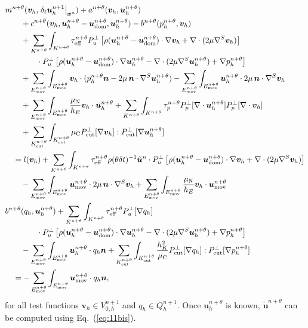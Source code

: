 \documentclass[11pt,a4paper,oneside,reqno]{amsart}
\newcommand{\Eq}[1]{(\ref{eq:#1})}
\newcommand{\sbm}[1]  {\mbox{{\boldmath{$\scriptstyle{#1}$}}}}
\def\u{{\bm u}}
\def\cl{\nonumber\\}
\def\el{{\nonumber}}
\def\nor{{\bm n}}
\def\vt{\bm v}
\begin{document}
\begin{align}
& m^{n+\theta}( \vt_h , \left. \delta_t\u_h^{n+1}\right\vert_{{\sbm x}^n})
+ a^{n+\theta}( \vt_h , \u_h^{n+\theta}) \cl
&\qquad + c^{n+\theta} (\vt_h ,  \u_h^{n+\theta}-{\u_{\rm dom}^{n+\theta}} , \u_h^{n+\theta})
- b^{n+\theta}( p_h^{n+\theta} ,\vt_h) \cl
%
& \qquad + \sum_{K^{n+\theta}} \int_{K^{n+\theta}} \tau^{n+\theta}_{\rm eff} 
P_u^\bot \left[
\rho (\u_h^{n+\theta}-{\u_{\rm dom}^{n+\theta}})\cdot\nabla\vt_h + \nabla\cdot (2\mu \nabla^S\vt_h)\right]\cl
& \qquad  \qquad \cdot 
P_u^\bot \left[
 \rho (\u_h^{n+\theta}-{\u_{\rm dom}^{n+\theta}})\cdot\nabla\u_h^{n+\theta}
- \nabla\cdot (2\mu \nabla^S\u_h^{n+\theta}) + \nabla p_h^{n+\theta}\right]\cl
%
& \qquad + \sum_{E_{\rm mov}^{n+\theta}} \int_{E_{\rm mov}^{n+\theta}}
\vt_h \cdot (p_h^{n+\theta} \nor - 2 \mu \, \nor \cdot \nabla^S \u_h^{n+\theta})
- \sum_{E_{\rm mov}^{n+\theta}} \int_{E_{\rm mov}^{n+\theta}}
\u_h^{n+\theta}  \cdot 2 \mu \, \nor \cdot \nabla^S \vt_h\cl
%
& \qquad + \sum_{E_{\rm mov}^{n+\theta}} \int_{E_{\rm mov}^{n+\theta}}
\frac{\mu_{\rm N}}{h_E} \vt_h \cdot \u_h^{n+\theta} +  \sum_{K^{n+\theta}}  \int_{K^{n+\theta}}   \tau_p^{n+\theta} P_p^\bot[ \nabla \cdot \u_h^{n+\theta}] P_p^\bot[ \nabla \cdot \vt_h]\cl
& \qquad + \sum_{K^{n+\theta}_{\rm cut}} \int_{K^{n+\theta}_{\rm cut}}
\mu_{\rm C} P^\bot_{\rm cut}[\nabla \vt_h] : P^\bot_{\rm cut}[\nabla \u_h^{n+\theta}] \cl
& \quad 
= l(\vt_h) 
    +   \sum_{K^{n+\theta}}  \int_{K^{n+\theta}} \tau^{n+\theta}_{\rm eff} \rho (\theta \delta t)^{-1} \tilde{\u}^n 
\cdot P_u^\bot \left[
\rho (\u_h^{n+\theta}-{\u_{\rm dom}^{n+\theta}})\cdot\nabla\vt_h + \nabla\cdot (2\mu \nabla^S\vt_h)\right]\cl
% 
& \qquad - \sum_{E_{\rm mov}^{n+\theta}} \int_{E_{\rm mov}^{n+\theta}}
 \u_{\rm mov}^{n+\theta} \cdot 2 \mu \, \nor \cdot \nabla^S \vt_h
 + \sum_{E_{\rm mov}^{n+\theta}} \int_{E_{\rm mov}^{n+\theta}}
\frac{\mu_{\rm N}}{h_E} \vt_h \cdot  \u_{\rm mov}^{n+\theta}\cl
%
&b^{n+\theta} ( q_h , \u_h^{n+\theta} ) +  \sum_{K^{n+\theta}}  \int_{K^{n+\theta}} \tau_{\rm eff}^{n+\theta}  P_u^\bot [ \nabla q_h] \cl
& \qquad \qquad \cdot
 P_u^\bot \left[
 \rho (\u_h^{n+\theta}-{\u_{\rm dom}^{n+\theta}})\cdot\nabla\u_h^{n+\theta}
- \nabla\cdot (2\mu \nabla^S\u_h^{n+\theta}) + \nabla p_h^{n+\theta}\right] \cl
%
& \qquad - \sum_{E_{\rm mov}^{n+\theta}} \int_{E_{\rm mov}^{n+\theta}}
\u_h^{n+\theta}  \cdot q_h\nor 
+ \sum_{K^{n+\theta}_{\rm cut}} \int_{K^{n+\theta}_{\rm cut}}
\frac{h_K^2}{\mu_{\rm C}} P^\bot_{\rm cut}[\nabla q_h] : P^\bot_{\rm cut}[\nabla p_h^{n+\theta}] \cl
& \quad = 
- \sum_{E_{\rm mov}^{n+\theta}} \int_{E_{\rm mov}^{n+\theta}}
 \u_{\rm mov}^{n+\theta} \cdot q_h\nor,\el
\end{align}
for all test functions $\vt_h\in V^{n+1}_{0,h}$ and $q_h\in Q^{n+1}_h$. Once $\u_h^{n+\theta}$ is known, $\tilde{\u}^{n+\theta}$ can be computed using Eq.~\Eq{11bis}.
\end{document}
